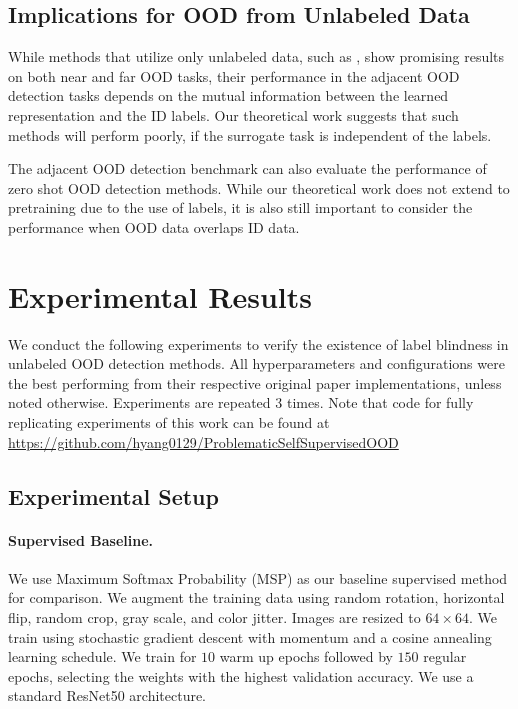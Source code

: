 \documentclass{article} %
\theoremstyle{plain}
\theoremstyle{definition}
\theoremstyle{remark}
\begin{document}
\subsection{Implications for OOD from Unlabeled Data}

While methods that utilize only unlabeled data, such as \citep{sehwag2021ssd, liu2023unsupervised, guille2024cadet}, show promising results on both near and far OOD tasks, their performance in the adjacent OOD detection tasks depends on the mutual information between the learned representation and the ID labels. Our theoretical work suggests that such methods will perform poorly, if the surrogate task is independent of the labels. 

The adjacent OOD detection benchmark can also evaluate the performance of zero shot OOD detection methods. While our theoretical work does not extend to pretraining due to the use of labels, it is also still important to consider the performance when OOD data overlaps ID data. 

\section{Experimental Results}

We conduct the following experiments to verify the existence of label blindness in unlabeled OOD detection methods. All hyperparameters and configurations were the best performing from their respective original paper implementations, unless noted otherwise. Experiments are repeated 3 times. Note that code for fully replicating experiments of this work can be found at \url{https://github.com/hyang0129/ProblematicSelfSupervisedOOD}

\subsection{Experimental Setup}
\label{expsetup}

\vspace{-2mm}\paragraph{Supervised Baseline.}

We use Maximum Softmax Probability (MSP) \citep{hendrycks2016baseline} as our baseline supervised method for comparison. We augment the training data using random rotation, horizontal flip, random crop, gray scale, and color jitter. Images are resized to $64\times64$. We train using stochastic gradient descent with momentum and a cosine annealing learning schedule. We train for $10$ warm up epochs followed by $150$ regular epochs, selecting the weights with the highest validation accuracy. We use a standard ResNet50 architecture.
\end{document}
